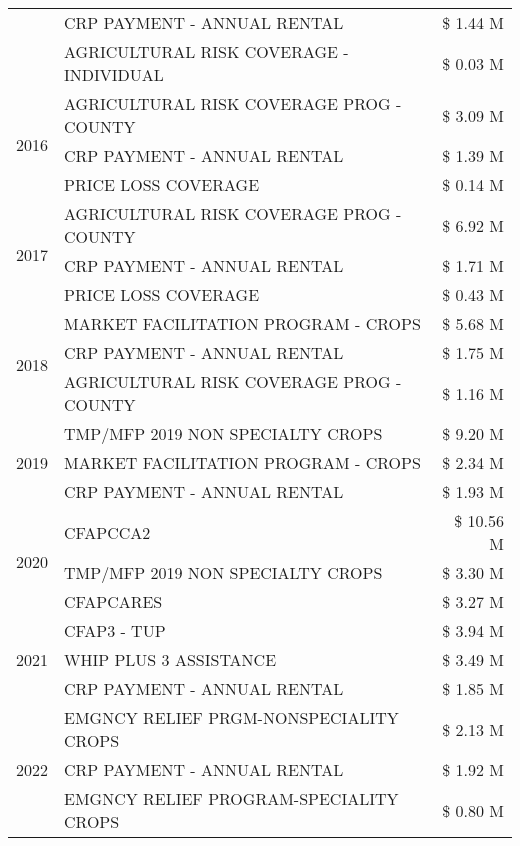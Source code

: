 \begin{tabular}{llr}
 & CRP PAYMENT - ANNUAL RENTAL & \$ 1.44 M \\
 & AGRICULTURAL RISK COVERAGE - INDIVIDUAL & \$ 0.03 M \\
\cline{1-3}
\multirow[t]{3}{*}{2016} & AGRICULTURAL RISK COVERAGE PROG - COUNTY & \$ 3.09 M \\
 & CRP PAYMENT - ANNUAL RENTAL & \$ 1.39 M \\
 & PRICE LOSS COVERAGE & \$ 0.14 M \\
\cline{1-3}
\multirow[t]{3}{*}{2017} & AGRICULTURAL RISK COVERAGE PROG - COUNTY & \$ 6.92 M \\
 & CRP PAYMENT - ANNUAL RENTAL & \$ 1.71 M \\
 & PRICE LOSS COVERAGE & \$ 0.43 M \\
\cline{1-3}
\multirow[t]{3}{*}{2018} & MARKET FACILITATION PROGRAM - CROPS & \$ 5.68 M \\
 & CRP PAYMENT - ANNUAL RENTAL & \$ 1.75 M \\
 & AGRICULTURAL RISK COVERAGE PROG - COUNTY & \$ 1.16 M \\
\cline{1-3}
\multirow[t]{3}{*}{2019} & TMP/MFP 2019 NON SPECIALTY CROPS & \$ 9.20 M \\
 & MARKET FACILITATION PROGRAM - CROPS & \$ 2.34 M \\
 & CRP PAYMENT - ANNUAL RENTAL & \$ 1.93 M \\
\cline{1-3}
\multirow[t]{3}{*}{2020} & CFAPCCA2 & \$ 10.56 M \\
 & TMP/MFP 2019 NON SPECIALTY CROPS & \$ 3.30 M \\
 & CFAPCARES & \$ 3.27 M \\
\cline{1-3}
\multirow[t]{3}{*}{2021} & CFAP3 - TUP & \$ 3.94 M \\
 & WHIP PLUS 3 ASSISTANCE & \$ 3.49 M \\
 & CRP PAYMENT - ANNUAL RENTAL & \$ 1.85 M \\
\cline{1-3}
\multirow[t]{3}{*}{2022} & EMGNCY RELIEF PRGM-NONSPECIALITY CROPS & \$ 2.13 M \\
 & CRP PAYMENT - ANNUAL RENTAL & \$ 1.92 M \\
 & EMGNCY RELIEF PROGRAM-SPECIALITY CROPS & \$ 0.80 M \\
\cline{1-3}
\bottomrule
\end{tabular}
